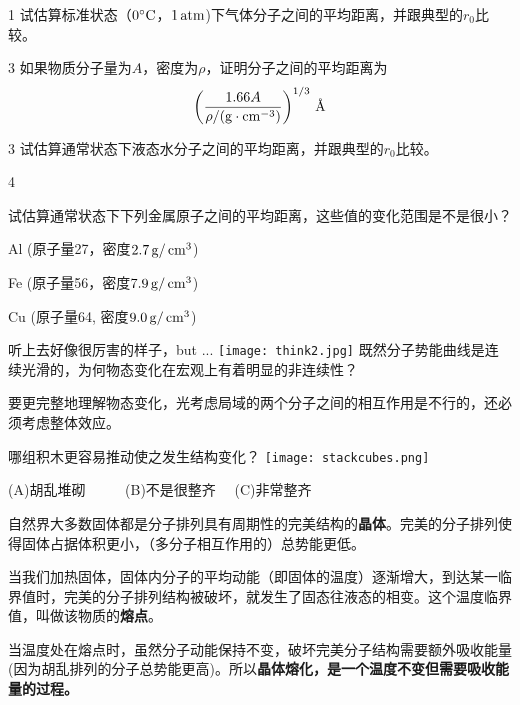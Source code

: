 \documentclass[CJK]{beamer}
\begin{document}
\begin{frame}
\bch
\bitem
\item[1]{试估算标准状态（$0^\circ \mathrm{C}$，$1\,\mathrm{atm}$)下气体分子之间的平均距离，并跟典型的$r_0$比较。}
\item[3]{如果物质分子量为$A$，密度为$\rho$，证明分子之间的平均距离为
$$\left(\frac{1.66 A }{\rho / (\mathrm{g}\cdot \mathrm{cm}^{-3})}\right)^{1/3}\,\text{\AA}$$
}
\item[3]{试估算通常状态下液态水分子之间的平均距离，并跟典型的$r_0$比较。}
\item[4]{试估算通常状态下下列金属原子之间的平均距离，这些值的变化范围是不是很小？

Al (原子量27，密度$2.7\,\mathrm{g}/\,\mathrm{cm}^3$)

Fe (原子量56，密度$7.9\,\mathrm{g}/\,\mathrm{cm}^3$)

Cu (原子量64, 密度$9.0\,\mathrm{g}/\,\mathrm{cm}^3$)
}
\eitem
\ech
\end{frame}


\begin{frame}
\bch
听上去好像很厉害的样子，but ...
\bcenter
\texttt{[image: think2.jpg]}
\ecenter
既然分子势能曲线是连续光滑的，为何物态变化在宏观上有着明显的非连续性？
\ech
\end{frame}

\begin{frame}
\bch
要更完整地理解物态变化，光考虑局域的两个分子之间的相互作用是不行的，还必须考虑整体效应。
\ech
\end{frame}

\begin{frame}
\bch
哪组积木更容易推动使之发生结构变化？
\texttt{[image: stackcubes.png]}

(A)胡乱堆砌 \ \ \ \ \  (B)不是很整齐 \ \ (C)非常整齐

\ech
\end{frame}

\begin{frame}
\bch
\bitem
\item{自然界大多数固体都是分子排列具有周期性的完美结构的{\bf 晶体}。完美的分子排列使得固体占据体积更小，（多分子相互作用的）总势能更低。}
\item{当我们加热固体，固体内分子的平均动能（即固体的温度）逐渐增大，到达某一临界值时，完美的分子排列结构被破坏，就发生了固态往液态的相变。这个温度临界值，叫做该物质的{\bf 熔点}。}
\item{当温度处在熔点时，虽然分子动能保持不变，破坏完美分子结构需要额外吸收能量(因为胡乱排列的分子总势能更高)。所以{\bf 晶体熔化，是一个温度不变但需要吸收能量的过程。}}
\eitem
\ech
\end{frame}
\end{document}
